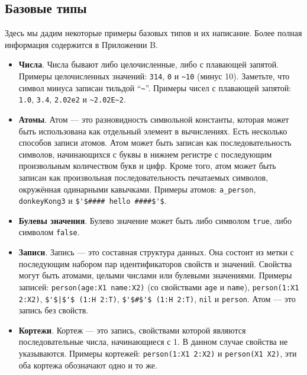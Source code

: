 \subsection{Базовые типы}\label{subsection:basic_types}

Здесь мы дадим некоторые примеры базовых типов и их написание. Более полная информация содержится в Приложении B.

\begin{itemize}

\item{\textbf{Числа}. Числа бывают либо целочисленные, либо с плавающей запятой. Примеры целочисленных значений: \lstinline|314|, \lstinline|0| и \lstinline|~10| (минус 10). Заметьте, что символ минуса записан тильдой ``\lstinline|~|''. Примеры чисел с плавающей запятой: \lstinline|1.0|, \lstinline|3.4|, \lstinline|2.02e2| и \lstinline|~2.02E~2|.}

\item{\textbf{Атомы}. Атом --- это разновидность символьной константы, которая может быть использована как отдельный элемент в вычислениях. Есть несколько способов записи атомов. Атом может быть записан как последовательность символов, начинающихся с буквы в нижнем регистре с последующим произвольным количеством букв и цифр. Кроме того, атом может быть записан как произвольная последовательность печатаемых символов, окружённая одинарными кавычками. Примеры атомов: \lstinline|a_person|, \lstinline|donkeyKong3| и \lstinline|$'$#### hello ####$'$|.}

\item{\textbf{Булевы значения}. Булево значение может быть либо символом \lstinline|true|, либо символом \lstinline|false|.}

\item{\textbf{Записи}. Запись --- это составная структура данных. Она состоит из метки с последующим набором пар идентификаторов свойств и значений. Свойства могут быть атомами, целыми числами или булевыми значениями. Примеры записей: \lstinline|person(age:X1 name:X2)| (со свойствами \lstinline|age| и \lstinline|name|),  \lstinline|person(1:X1 2:X2)|,  \lstinline!$'$|$'$ (1:H 2:T)!, \lstinline!$'$#$'$ (1:H 2:T)!, \lstinline|nil| и \lstinline|person|. Атом --- это запись без свойств.}

\item{\textbf{Кортежи}. Кортеж --- это запись, свойствами которой являются последовательные числа, начинающиеся с 1. В данном случае свойства не указываются. Примеры кортежей: \lstinline|person(1:X1 2:X2)| и \lstinline|person(X1 X2)|, эти оба кортежа обозначают одно и то же.}


\end{itemize}
